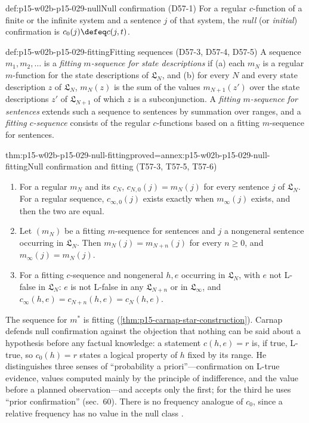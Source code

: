 \begin{hbdefinition}{def:p15-w02b-p15-029-null}{Null confirmation (D57-1)}
For a regular \(c\)-function of a finite or the infinite system and a
sentence \(j\) of that system, the \emph{null} (or \emph{initial})
confirmation is \(c_0(j)\defeq c(j,t)\).
\end{hbdefinition}

\begin{hbdefinition}{def:p15-w02b-p15-029-fitting}{Fitting sequences (D57-3, D57-4, D57-5)}
A sequence \(m_1,m_2,\ldots\) is a \emph{fitting \(m\)-sequence for
state descriptions} if (a) each \(m_N\) is a regular \(m\)-function
for the state descriptions of \(\mathfrak L_N\), and (b) for every
\(N\) and every state description \(z\) of \(\mathfrak L_N\),
\(m_N(z)\) is the sum of the values \(m_{N+1}(z')\) over the state
descriptions \(z'\) of \(\mathfrak L_{N+1}\) of which \(z\) is a
subconjunction. A \emph{fitting \(m\)-sequence for sentences} extends
such a sequence to sentences by summation over ranges, and a
\emph{fitting \(c\)-sequence} consists of the regular \(c\)-functions
based on a fitting \(m\)-sequence for sentences.
\end{hbdefinition}

\begin{hbtheorem}{thm:p15-w02b-p15-029-null-fitting}{proved=annex:p15-w02b-p15-029-null-fitting}{Null confirmation and fitting (T57-3, T57-5, T57-6)}
\begin{enumerate}
 \item For a regular \(m_N\) and its \(c_N\), \(c_{N,0}(j)=m_N(j)\)
       for every sentence \(j\) of \(\mathfrak L_N\). For a regular
       sequence, \(c_{\infty,0}(j)\) exists exactly when
       \(m_\infty(j)\) exists, and then the two are equal.
 \item Let \((m_N)\) be a fitting \(m\)-sequence for sentences and
       \(j\) a nongeneral sentence occurring in \(\mathfrak L_N\).
       Then \(m_N(j)=m_{N+n}(j)\) for every \(n\geq0\), and
       \(m_\infty(j)=m_N(j)\).
 \item For a fitting \(c\)-sequence and nongeneral \(h,e\) occurring
       in \(\mathfrak L_N\), with \(e\) not L-false in
       \(\mathfrak L_N\): \(e\) is not L-false in any
       \(\mathfrak L_{N+n}\) or in \(\mathfrak L_\infty\), and
       \(c_\infty(h,e)=c_{N+n}(h,e)=c_N(h,e)\).
\end{enumerate}
\end{hbtheorem}

The sequence for \(m^*\) is fitting (\cref{thm:p15-carnap-star-construction}).
Carnap defends null confirmation against the objection that nothing can
be said about a hypothesis before any factual knowledge: a statement
\(c(h,e)=r\) is, if true, L-true, so \(c_0(h)=r\) states a logical
property of \(h\) fixed by its range. He distinguishes three senses of
``probability a priori''---confirmation on L-true evidence, values
computed mainly by the principle of indifference, and the value before a
planned observation---and accepts only the first; for the third he uses
``prior confirmation'' (sec.~60). There is no frequency analogue of
\(c_0\), since a relative frequency has no value in the null class
\cite[sec.~57B, pp.~308--309]{Carnap1950Probability}.

